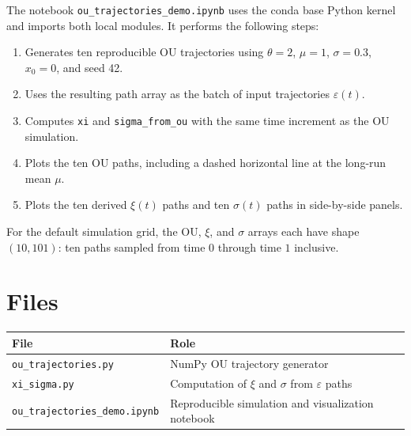 \documentclass[11pt]{article}
\begin{document}
The notebook \texttt{ou\_trajectories\_demo.ipynb} uses the conda base Python
kernel and imports both local modules. It performs the following steps:
\begin{enumerate}
    \item Generates ten reproducible OU trajectories using
          $\theta=2$, $\mu=1$, $\sigma=0.3$, $x_0=0$, and seed 42.
    \item Uses the resulting path array as the batch of input trajectories
          $\varepsilon(t)$.
    \item Computes \texttt{xi} and \texttt{sigma\_from\_ou} with the same
          time increment as the OU simulation.
    \item Plots the ten OU paths, including a dashed horizontal line at
          the long-run mean $\mu$.
    \item Plots the ten derived $\xi(t)$ paths and ten $\sigma(t)$ paths in
          side-by-side panels.
\end{enumerate}

For the default simulation grid, the OU, $\xi$, and $\sigma$ arrays each have
shape $(10,101)$: ten paths sampled from time $0$ through time $1$ inclusive.

\section{Files}

\begin{center}
    \begin{tabular}{ll}
        \toprule
        File                                  & Role                                                       \\
        \midrule
        \texttt{ou\_trajectories.py}          & NumPy OU trajectory generator                              \\
        \texttt{xi\_sigma.py}                 & Computation of $\xi$ and $\sigma$ from $\varepsilon$ paths \\
        \texttt{ou\_trajectories\_demo.ipynb} & Reproducible simulation and visualization notebook         \\
        \bottomrule
    \end{tabular}
\end{center}
\end{document}
